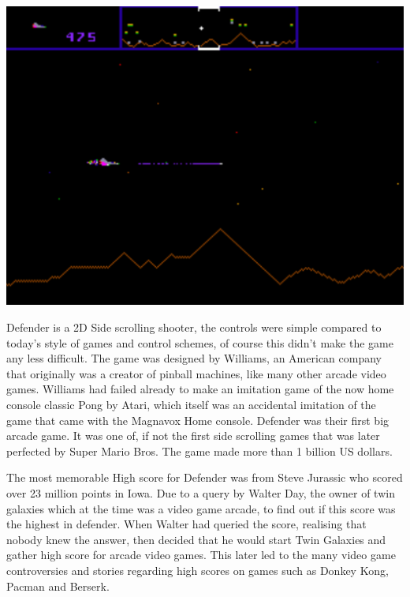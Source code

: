 \documentclass{article}
\begin{document}
\begin{minipage}{0.4\textwidth}
\includegraphics[width=\linewidth]{defender}
\end{minipage} \hfill
\begin{minipage}{0.55\textwidth}\raggedright
Defender is a 2D Side scrolling shooter, the controls were simple compared to today's style of games and control schemes, of course this didn't make the game any less difficult. \newline \newline
The game was designed by Williams, an American company that originally was a creator of pinball machines, like many other arcade video games.
Williams had failed already to make an imitation game of the now home console classic Pong by Atari, which itself was an accidental imitation of the game that came with the Magnavox Home console. Defender was their first big arcade game. It was one of, if not the first side scrolling  games that was later perfected by Super Mario Bros. The game made more than 1 billion US dollars. \newline
\end{minipage} \newline \newline

The most memorable High score for Defender was from Steve Jurassic who scored over 23 million points in Iowa. Due to a query by Walter Day, the owner of twin galaxies which at the time was a video game arcade, to find out if this score was the highest in defender. When Walter had queried the score, realising that nobody knew the answer, then decided that he would start Twin Galaxies and gather high score for arcade video games. This later led to the many video game controversies and stories regarding high scores on games such as Donkey Kong, Pacman and Berserk. \newline
\end{document}
